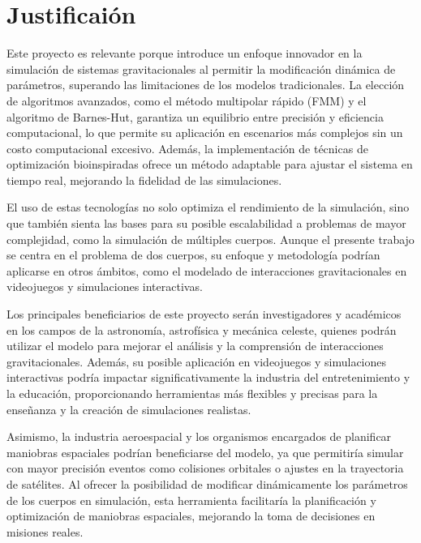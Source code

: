 \section{Justificaión}
Este proyecto es relevante porque introduce un enfoque innovador en la simulación de sistemas gravitacionales al permitir la modificación dinámica de parámetros, superando las limitaciones de los modelos tradicionales. La elección de algoritmos avanzados, como el método multipolar rápido (FMM) y el algoritmo de Barnes-Hut, garantiza un equilibrio entre precisión y eficiencia computacional, lo que permite su aplicación en escenarios más complejos sin un costo computacional excesivo. Además, la implementación de técnicas de optimización bioinspiradas ofrece un método adaptable para ajustar el sistema en tiempo real, mejorando la fidelidad de las simulaciones.

El uso de estas tecnologías no solo optimiza el rendimiento de la simulación, sino que también sienta las bases para su posible escalabilidad a problemas de mayor complejidad, como la simulación de múltiples cuerpos. Aunque el presente trabajo se centra en el problema de dos cuerpos, su enfoque y metodología podrían aplicarse en otros ámbitos, como el modelado de interacciones gravitacionales en videojuegos y simulaciones interactivas.

Los principales beneficiarios de este proyecto serán investigadores y académicos en los campos de la astronomía, astrofísica y mecánica celeste, quienes podrán utilizar el modelo para mejorar el análisis y la comprensión de interacciones gravitacionales. Además, su posible aplicación en videojuegos y simulaciones interactivas podría impactar significativamente la industria del entretenimiento y la educación, proporcionando herramientas más flexibles y precisas para la enseñanza y la creación de simulaciones realistas.

Asimismo, la industria aeroespacial y los organismos encargados de planificar maniobras espaciales podrían beneficiarse del modelo, ya que permitiría simular con mayor precisión eventos como colisiones orbitales o ajustes en la trayectoria de satélites. Al ofrecer la posibilidad de modificar dinámicamente los parámetros de los cuerpos en simulación, esta herramienta facilitaría la planificación y optimización de maniobras espaciales, mejorando la toma de decisiones en misiones reales.